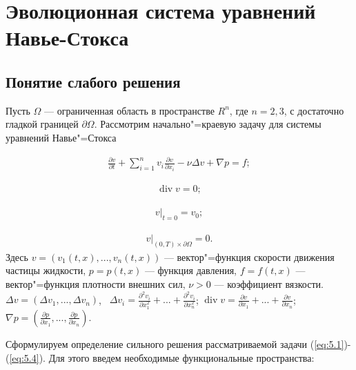 \section{Эволюционная система уравнений \\Навье-Стокса}
\subsection {Понятие слабого решения}
Пусть $\Omega$ --- ограниченная область в пространстве $R^n$, где $n=2, 3$, с достаточно гладкой границей $\partial\Omega$.
Рассмотрим начально"=краевую задачу для системы уравнений Навье"=Стокса

\begin{equation}\label{eq:5.1}
    \begin{gathered}
        \frac{\partial v}{\partial t}+\sum_{i=1}^nv_i\frac{\partial v}{\partial x_i}-\nu\Delta v+\nabla p=f;
    \end{gathered}
\end{equation}

\begin{equation}\label{eq:5.2}
    \begin{gathered}
        \operatorname{div} v=0;
    \end{gathered}
\end{equation}

\begin{equation}\label{eq:5.3}
    \begin{gathered}
        v|_{t=0}=v_0;
    \end{gathered}
\end{equation}

\begin{equation}\label{eq:5.4}
    \begin{gathered}
        v|_{(0, T)\times\partial\Omega}=0.
    \end{gathered}
\end{equation}
Здесь $v=(v_1(t, x),...,v_n(t, x))$ --- вектор"=функция скорости движения частицы жидкости, $p=p(t, x)$ --- функция давления,
$f=f(t, x)$ --- вектор"=функция плотности внешних сил, $\nu>0$ --- коэффициент вязкости.
$\Delta v=(\Delta v_1,...,\Delta v_n)$, \ $\Delta v_i= \frac{\partial^2 v_i}{\partial x_1^2}+...+\frac{\partial^2 v_i}{\partial x_n^2}$;
$\operatorname{div} v= \frac{\partial v}{\partial x_1}+...+\frac{\partial v}{\partial x_n}$;
$\nabla p=(\frac{\partial p}{\partial x_1},...,\frac{\partial p}{\partial x_n})$.

Сформулируем определение сильного решения рассматриваемой задачи (\ref{eq:5.1})-(\ref{eq:5.4}).
Для этого введем необходимые функциональные пространства:

